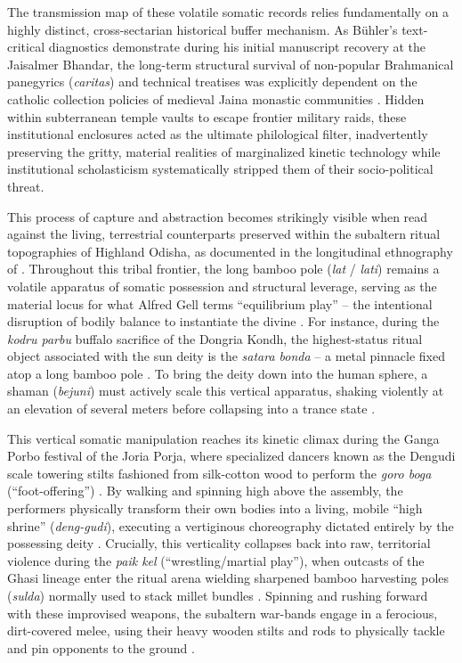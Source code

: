 \documentclass[11pt,twoside,letterpaper]{article}
\begin{document}
The transmission map of these volatile somatic records relies fundamentally on a highly distinct, cross-sectarian historical buffer mechanism. As Bühler’s text-critical diagnostics demonstrate during his initial manuscript recovery at the Jaisalmer Bhandar, the long-term structural survival of non-popular Brahmanical panegyrics (\textit{caritas}) and technical treatises was explicitly dependent on the catholic collection policies of medieval Jaina monastic communities \citep{Buhler1875}. Hidden within subterranean temple vaults to escape frontier military raids, these institutional enclosures acted as the ultimate philological filter, inadvertently preserving the gritty, material realities of marginalized kinetic technology while institutional scholasticism systematically stripped them of their socio-political threat. 

This process of capture and abstraction becomes strikingly visible when read against the living, terrestrial counterparts preserved within the subaltern ritual topographies of Highland Odisha, as documented in the longitudinal ethnography of \citet{Berger2015, Berger2023}. Throughout this tribal frontier, the long bamboo pole (\textit{lat} / \textit{lati}) remains a volatile apparatus of somatic possession and structural leverage, serving as the material locus for what Alfred Gell terms ``equilibrium play'' -- the intentional disruption of bodily balance to instantiate the divine \citep{Gell1980, Berger2023}. For instance, during the \textit{kodru parbu} buffalo sacrifice of the Dongria Kondh, the highest-status ritual object associated with the sun deity is the \textit{satara bonda} -- a metal pinnacle fixed atop a long bamboo pole \citep{Berger2023}. To bring the deity down into the human sphere, a shaman (\textit{bejuni}) must actively scale this vertical apparatus, shaking violently at an elevation of several meters before collapsing into a trance state \citep{Berger2023}. 

This vertical somatic manipulation reaches its kinetic climax during the Ganga Porbo festival of the Joria Porja, where specialized dancers known as the Dengudi scale towering stilts fashioned from silk-cotton wood to perform the \textit{goro boga} (``foot-offering'') \citep{Berger2015}. By walking and spinning high above the assembly, the performers physically transform their own bodies into a living, mobile ``high shrine'' (\textit{deng-gudi}), executing a vertiginous choreography dictated entirely by the possessing deity \citep{Berger2015}. Crucially, this verticality collapses back into raw, territorial violence during the \textit{paik kel} (``wrestling/martial play''), when outcasts of the Ghasi lineage enter the ritual arena wielding sharpened bamboo harvesting poles (\textit{sulda}) normally used to stack millet bundles \citep{Berger2015}. Spinning and rushing forward with these improvised weapons, the subaltern war-bands engage in a ferocious, dirt-covered melee, using their heavy wooden stilts and rods to physically tackle and pin opponents to the ground \citep{Berger2015}. 
\end{document}
